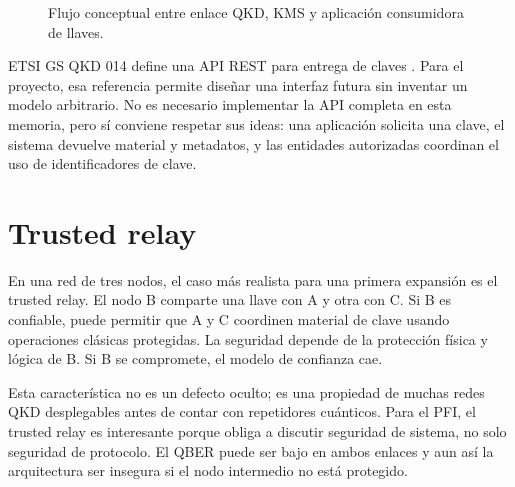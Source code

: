 \begin{figure}[H]
  \centering
  \caption{Flujo conceptual entre enlace QKD, KMS y aplicación consumidora de llaves.}
  \label{fig:kms_flujo}
\end{figure}

ETSI GS QKD 014 define una API REST para entrega de claves \cite{etsiQKD014}. Para el proyecto, esa referencia permite diseñar una interfaz futura sin inventar un modelo arbitrario. No es necesario implementar la API completa en esta memoria, pero sí conviene respetar sus ideas: una aplicación solicita una clave, el sistema devuelve material y metadatos, y las entidades autorizadas coordinan el uso de identificadores de clave.

\section{Trusted relay}

En una red de tres nodos, el caso más realista para una primera expansión es el trusted relay. El nodo B comparte una llave con A y otra con C. Si B es confiable, puede permitir que A y C coordinen material de clave usando operaciones clásicas protegidas. La seguridad depende de la protección física y lógica de B. Si B se compromete, el modelo de confianza cae.

Esta característica no es un defecto oculto; es una propiedad de muchas redes QKD desplegables antes de contar con repetidores cuánticos. Para el PFI, el trusted relay es interesante porque obliga a discutir seguridad de sistema, no solo seguridad de protocolo. El QBER puede ser bajo en ambos enlaces y aun así la arquitectura ser insegura si el nodo intermedio no está protegido.

